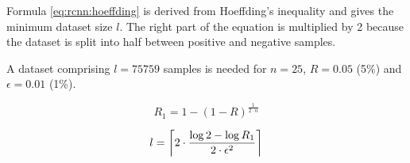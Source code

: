 Formula \ref{eq:rcnn:hoeffding} is derived from Hoeffding's inequality
\cite{hoeffding1994probability} and gives the minimum dataset size $l$. The
right part of the equation is multiplied by 2 because the dataset is split into
half between positive and negative samples.

A dataset comprising $l = 75759$ samples is needed for $n = 25$, $R = 0.05$
(5\%) and $\epsilon = 0.01$ (1\%).

\begin{equation}
  R_1 = 1 - (1 - R)^\frac{1}{2 \cdot n}
  \label{eq:rcnn:proba-single}
\end{equation}

\begin{equation}
  l = \ceil*{2 \cdot \frac{\log 2 - \log R_1}{2 \cdot \epsilon^2}}
  \label{eq:rcnn:hoeffding}
\end{equation}
